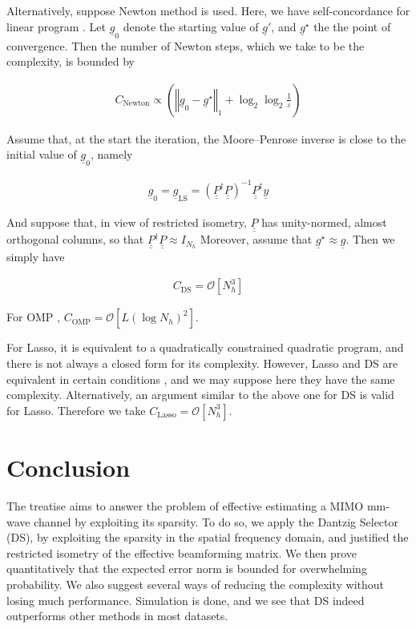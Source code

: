 \documentclass[journal]{IEEEtran}
\newcommand {\e} {\varepsilon}
\newcommand {\m} [1] {\( #1 \)}
\newcommand {\V} [1] {\underline {#1}}
\newcommand {\M} [1] {\underline {\underline {#1}}}
\newcommand {\RB} [1] {\left( #1 \right)}
\newcommand {\SB} [1] {\left[ #1 \right]}
\newcommand {\VNm} [1] {\left \Vert #1 \right \Vert}
\newcommand {\Disp} [1] {
   \begin {align*}
      #1
   \end {align*}
}
\begin{document}
Alternatively, suppose Newton method is used.
Here, we have self-concordance for linear program \cite {BoV04}.
Let \m {\V {g} _0} denote the starting value of \m {\V {g}'}, and \m {\V {g} ^{\star}} the the point of convergence.
Then the number of Newton steps, which we take to be the complexity, is bounded by \cite {BoV04}
\Disp {
C_{\mathrm {Newton}}
\propto \RB {\VNm {\V {g}_0 -\V {g} ^{\star}}_1
+ \log_2 \log_2 \frac {1} {\e}}
}

Assume that, at the start the iteration, the Moore–Penrose inverse is close to the initial value of \m {\V {g}_0}, namely
%
\Disp {
\V {g}_0
=\V {g}_{\mathrm {LS}}
= \RB {\M {P} ^\dagger \M {P}} ^{-1} \M {P} ^\dagger \V {y} 
}
And suppose that, in view of restricted isometry, \m {\M {P}} has unity-normed, almost orthogonal columns, so that
\m {\M {P} ^\dagger \M {P} \approx I _{N_h}}
Moreover, assume that \m {\V {g} ^\star \approx \V {g}}.
Then we simply have
\Disp {
C_{\mathrm {DS}}
=\mathcal {O} \SB {N_h ^3} 
}

For OMP \cite {TrG07}, \m {C_{\mathrm {OMP}} =\mathcal {O} \SB {L \RB {\log N_h} ^2}}.

For Lasso, it is equivalent to a quadratically constrained quadratic program, and there is not always a closed form for its complexity.
However, Lasso and DS are equivalent in certain conditions \cite {AsR10}, and we may suppose here they have the same complexity.
Alternatively, an argument similar to the above one for DS is valid for Lasso.
Therefore we take \m {C_{\mathrm {Lasso}} =\mathcal {O} \SB {N_h ^3}}.



\section{Conclusion}

The treatise aims to answer the problem of effective estimating a MIMO mm-wave channel by exploiting its sparsity.
To do so, we apply the Dantzig Selector (DS), by exploiting the sparsity in the spatial frequency domain, and justified the restricted isometry of the effective beamforming matrix.
We then prove quantitatively that the expected error norm is bounded for overwhelming probability.
We also suggest several ways of reducing the complexity without losing much performance.
Simulation is done, and we see that DS indeed outperforms other methods in most datasets.
\end{document}
